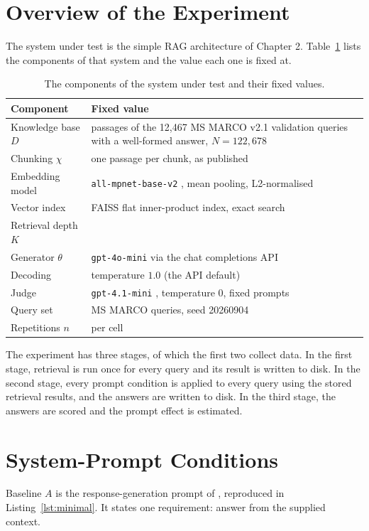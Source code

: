\documentclass[12pt,a4paper,oneside]{scrreprt}
\begin{document}
\section{Overview of the Experiment}
\label{sec:overview}

The system under test is the simple RAG architecture of Chapter 2. Table~\ref{tab:fixed} lists the components of that system and the value each one is fixed at.

\begin{table}[htbp]
\centering
\caption{The components of the system under test and their fixed values.}
\label{tab:fixed}
\begin{tabular}{l>{\raggedright\arraybackslash}p{}}
\toprule
Component & Fixed value \\
\midrule
Knowledge base $D$ & passages of the 12,467 MS MARCO v2.1 validation queries with a well-formed answer, $N = 122{,}678$ \\
Chunking $\chi$ & one passage per chunk, as published \\
Embedding model & \texttt{all-mpnet-base-v2} \citep{reimers2019sbert}, mean pooling, L2-normalised \\
Vector index & FAISS flat inner-product index, exact search \\
Retrieval depth $K$ & 10 \\
Generator $\theta$ & \texttt{gpt-4o-mini} \citep{openai2024gpt4omini} via the chat completions API \\
Decoding & temperature $1.0$ (the API default) \\
Judge & \texttt{gpt-4.1-mini} \citep{openai2025gpt41}, temperature $0$, fixed prompts \\
Query set & 100 MS MARCO queries, seed 20260904 \\
Repetitions $n$ & 3 per cell \\
\bottomrule
\end{tabular}
\end{table}

The experiment has three stages, of which the first two collect data. In the first stage, retrieval is run once for every query and its result is written to disk. In the second stage, every prompt condition is applied to every query using the stored retrieval results, and the answers are written to disk. In the third stage, the answers are scored and the prompt effect is estimated.

\section{System-Prompt Conditions}
\label{sec:conditions}
Baseline $A$ is the response-generation prompt of \citet{friel2024ragbench}, reproduced in Listing~\ref{lst:minimal}. It states one requirement: answer from the supplied context.
\end{document}
